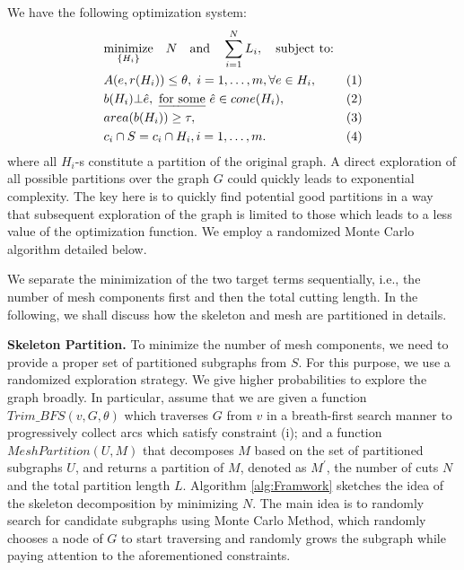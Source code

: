 We have the following optimization system:
\begin{equation*}
\begin{aligned}
& \underset{\{H_i\}}{\text{minimize}} \quad N \quad \text{and} \quad \sum_{i=1}^N{L_i},
\quad \text{subject to:} \\
& A(e, r(H_i)) \leq \theta, \; i = 1, \ldots, m, \forall e \in H_i, & (1)\\
& b(H_i) \bot \hat{e}, \text{ \emph{for some} } \hat{e} \in cone(H_i), & (2)\\
& area(b(H_i)) \geq \tau, & (3)\\
& c_i \cap S = c_i \cap H_i, i = 1, \ldots, m.  & (4)
\end{aligned}
\end{equation*}
where all $H_i$-s constitute a partition of the original graph. A direct exploration of all possible partitions over the graph $G$ could quickly leads to exponential complexity. The key here is to quickly find potential good partitions in a way that subsequent exploration of the graph is limited to those which leads to a less value of the optimization function. We employ a randomized Monte Carlo algorithm detailed below.

We separate the minimization of the two target terms sequentially, i.e., the number of mesh components first and then the total cutting length. In the following, we shall discuss how the skeleton and mesh are partitioned in details.

\textbf{Skeleton Partition.} {{To minimize the number of mesh components, we need to provide a proper set of partitioned subgraphs from $S$.}}
For this purpose, we use a randomized exploration strategy. We give higher probabilities to explore the graph broadly. In particular, assume that we are given a function $Trim\_BFS(v, G, \theta)$ which traverses $G$ from $v$ in a breath-first search manner to progressively collect arcs which satisfy constraint (i); and a function $MeshPartition(U, M)$ that decomposes $M$ based on the set of partitioned subgraphs $U$, and returns a partition of $M$, denoted as $M^{'}$, the number of cuts $N$ and the total partition length $L$. Algorithm \ref{alg:Framwork} sketches the idea of the skeleton decomposition {{by minimizing $N$}}. The main idea is to randomly search for candidate subgraphs using Monte Carlo Method, which randomly chooses a node of $G$ to start traversing and randomly grows the subgraph while paying attention to the aforementioned constraints.

